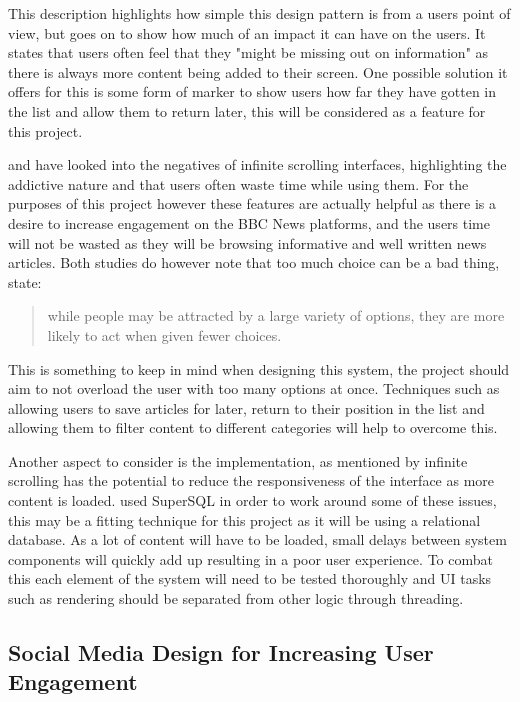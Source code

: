 \documentclass[12pt,titlepage]{article}
\begin{document}
  This description highlights how simple this design pattern is from a users
  point of view, but goes on to show how much of an impact it can have on the
  users. It states that users often feel that they "might be missing out on
  information" \cite{newtarget} as there is always more content being added to
  their screen. One possible solution it offers for this is some form of marker
  to show users how far they have gotten in the list and allow them to return
  later, this will be considered as a feature for this project.

  \cite{neyman} and \cite{karlsson} have looked into the negatives of infinite
  scrolling interfaces, highlighting the addictive nature and that users often
  waste time while using them. For the purposes of this project however these
  features are actually helpful as there is a desire to increase engagement on
  the BBC News platforms, and the users time will not be wasted as they will be
  browsing informative and well written news articles. Both studies do however
  note that too much choice can be a bad thing, \cite{karlsson} state:

  \begin{quote}
    while people may be attracted by a large variety of options, they are more
    likely to act when given fewer choices.
  \end{quote}

  This is something to keep in mind when designing this system, the project
  should aim to not overload the user with too many options at once. Techniques
  such as allowing users to save articles for later, return to their position in
  the list and allowing them to filter content to different categories will help
  to overcome this.

  Another aspect to consider is the implementation, as mentioned by
  \cite{newtarget} infinite scrolling has the potential to reduce the
  responsiveness of the interface as more content is loaded. \cite{tajima} used
  SuperSQL in order to work around some of these issues, this may be a fitting
  technique for this project as it will be using a relational database. As a lot
  of content will have to be loaded, small delays between system components will
  quickly add up resulting in a poor user experience. To combat this each
  element of the system will need to be tested thoroughly and UI tasks such as
  rendering should be separated from other logic through threading.

  \subsection{Social Media Design for Increasing User Engagement}
\end{document}
